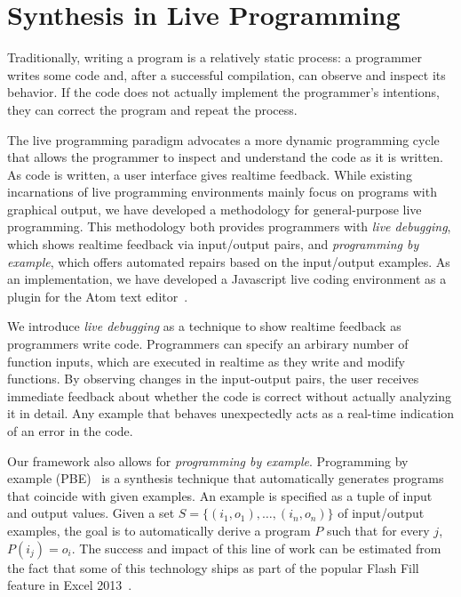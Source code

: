 \section{Synthesis in Live Programming}
\label{sec:intro}


Traditionally, writing a program is a relatively static process: a programmer writes some code and, after a successful compilation, can observe and inspect its behavior. If the code does not actually implement the programmer's intentions, they can correct the program and repeat the process.

The live programming paradigm advocates a more dynamic programming cycle that allows the programmer to inspect and understand the code as it is written. As code is written, a user interface gives realtime feedback.  While existing incarnations of live programming environments mainly focus on programs with graphical output, we have developed a methodology for general-purpose live programming.  
This methodology both provides programmers with \textit{live debugging}, which shows realtime feedback via input/output pairs, and \textit{programming by example}, which offers automated repairs based on the input/output examples. 
As an implementation, we have developed a Javascript live coding environment as a plugin for the Atom text editor~\cite{Atom}.

We introduce \textit{live debugging} as a technique to show realtime feedback as programmers write code.
Programmers can specify an arbirary number of function inputs,
which are executed in realtime as they write and modify functions.
By observing changes in the input-output pairs,
the user receives immediate feedback about whether the code is correct without actually analyzing it in detail.
Any example that behaves unexpectedly acts as a real-time indication of an error in the code. 

Our framework also allows for \textit{programming by example}.
Programming by example (PBE)~\cite{cypher93,lieberman01,synasc12} is a synthesis technique that automatically generates programs that coincide with given examples. An example is specified as a tuple of input and output values. Given a set $S= \{(i_1, o_1),\ldots, (i_n, o_n)\}$ of input/output examples, the goal is to automatically derive a program $P$ such that for every $j$, $P(i_j) = o_i$. The success and impact of this line of work can be estimated from the fact that some of this technology ships as part of the popular Flash Fill feature in Excel 2013~\cite{flashFillPOPL}.

